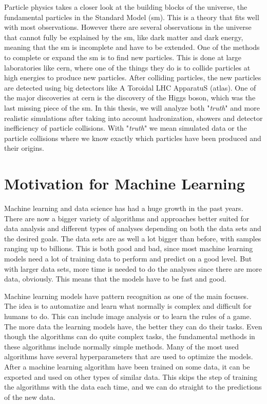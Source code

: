 \documentclass[a4paper, american, 12pt]{report}
\begin{document}
	Particle physics takes a closer look at the building blocks of the universe, the fundamental particles in the Standard Model (\acrshort{sm}). This is a theory that fits well with most observations. However there are several observations in the universe that cannot fully be explained by the \acrshort{sm}, like dark matter and dark energy, meaning that the \acrshort{sm} is incomplete and have to be extended. One of the methods to complete or expand the \acrshort{sm} is to find new particles. This is done at large laboratories like \acrshort{cern}, where one of the things they do is to collide particles at high energies to produce new particles. After colliding particles, the new particles are detected using big detectors like A Toroidal LHC ApparatuS (\acrshort{atlas}). One of the major discoveries at \acrshort{cern} is the discovery of the Higgs boson\cite{HiggsATLAS}\cite{HiggsCMS}, which was the last missing piece of the \acrshort{sm}. In this thesis, we will analyze both "\textit{truth}" and more realistic simulations after taking into account hadronization, showers and detector inefficiency of particle collisions. With "\textit{truth}" we mean simulated data or the particle collisions where we know exactly which particles have been produced and their origins.

	
	\section{Motivation for Machine Learning}
	\label{sect:Intro-Motivation}
	Machine learning and data science has had a huge growth in the past years. There are now a bigger variety of algorithms and approaches better suited for data analysis and different types of analyses depending on both the data sets and the desired goals. The data sets are as well a lot bigger than before, with samples ranging up to billions. This is both good and bad, since most machine learning models need a lot of training data to perform and predict on a good level. But with larger data sets, more time is needed to do the analyses since there are more data, obviously. This means that the models have to be fast and good.
	
	Machine learning models have pattern recognition as one of the main focuses. The idea is to automatize and learn what normally is complex and difficult for humans to do. This can include image analysis or to learn the rules of a game. The more data the learning models have, the better they can do their tasks. Even though the algorithms can do quite complex tasks, the fundamental methods in these algorithms include normally simple methods. Many of the most used algorithms have several hyperparameters that are used to optimize the models. After a machine learning algorithm have been trained on some data, it can be exported and used on other types of similar data. This skips the step of training the algorithms with the data each time, and we can do straight to the predictions of the new data. 
	
\end{document}
